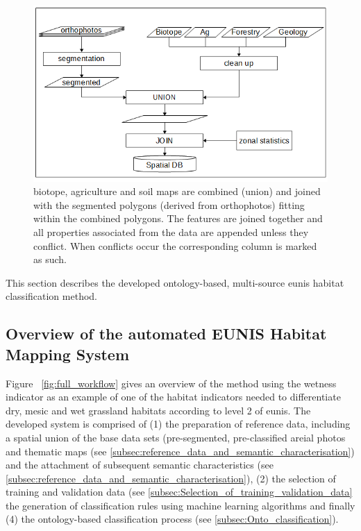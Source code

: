 \documentclass[authoryear,preprint,12pt,number]{elsarticle}
\begin{document}
\begin{figure} \includegraphics[width=1\textwidth]{diagrams/pre_processing.png}
    \caption{biotope, agriculture and soil maps are combined 
    (union) and joined with the segmented polygons (derived from 
    orthophotos) fitting within the combined polygons. The features are joined 
    together and all properties associated from the data are appended unless 
    they conflict. When conflicts occur the corresponding column is marked as 
    such.\label{fig:pre-processing}}
\end{figure}

This section describes the developed ontology-based, multi-source \gls{eunis} 
habitat classification method.
\label{subsec:method_overview}
\subsection{Overview of the automated EUNIS Habitat Mapping System}
Figure ~\ref{fig:full_workflow} gives an overview of the method using the
wetness indicator as an example of one of the habitat indicators needed to
differentiate dry, mesic and wet grassland habitats according to level 2 of
\gls{eunis}. The developed system is comprised of (1) the preparation of 
reference
data, including a spatial union of the base data sets (pre-segmented,
pre-classified areial photos and thematic maps (see
\ref{subsec:reference_data_and_semantic_characterisation}) and the attachment of
subsequent semantic characteristics (see 
\ref{subsec:reference_data_and_semantic_characterisation}), (2)
the selection of training and validation data (see
\ref{subsec:Selection_of_training_validation_data} the generation of
classification rules using machine learning algorithms and finally (4) the
ontology-based classification process (see \ref{subsec:Onto_classification}). 
\end{document}
